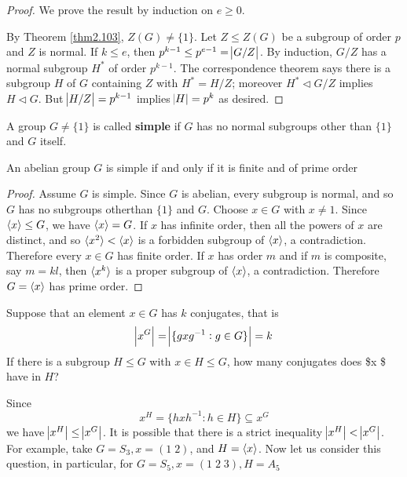 \documentclass[11pt]{article}
\begin{document}
\begin{proof}
We prove the result by induction on \(e\ge 0\).

By Theorem \ref{thm2.103}, \(Z(G)\neq\{1\}\). Let \(Z\le Z(G)\) be a subgroup of order
\(p\) and \(Z\) is normal. If \(k\le e\), then \(p^{k-1}\le p^{e-1}=\abs{G/Z}\). By
induction, \(G/Z\) has a normal subgroup \(H^*\) of order \(p^{k-1}\). The
correspondence theorem says there is a subgroup \(H\) of \(G\) containing \(Z\) with
\(H^*=H/Z\); moreover \(H^*\triangleleft G/Z\)  implies \(H\triangleleft G\). But
\(\abs{H/Z}=p^{k-1}\) implies \(\abs{H}=p^k\) as desired.
\end{proof}

\begin{definition}[]
A group \(G\neq\{1\}\) is called \textbf{simple} if \(G\) has no normal subgroups other than
\(\{1\}\) and  \(G\) itself.
\end{definition}

\begin{proposition}[]
An abelian group \(G\) is simple if and only if it is finite and of prime order
\end{proposition}
\begin{proof}
Assume \(G\) is simple. Since \(G\) is abelian, every subgroup is normal, and so \(G\)
has no subgroups otherthan \(\{1\}\) and \(G\). Choose \(x\in G\) with \(x\neq 1\).
Since \(\langle x\rangle\le G\), we have \(\langle x\rangle =G\). If \(x\) has infinite order, then
all the powers of \(x\) are distinct, and so \(\langle x^2\rangle<\langle x\rangle\) is a forbidden
subgroup of \(\langle x\rangle\), a contradiction. Therefore every \(x\in G\) has finite
order. If \(x\) has order \(m\) and if \(m\) is composite, say \(m=kl\), then 
\(\langle x^k\rangle\) is a proper subgroup of \(\langle x\rangle\), a contradiction. Therefore
\(G=\langle x\rangle\) has prime order.
\end{proof}

Suppose that an element \(x\in G\) has \(k\) conjugates, that is 
\begin{equation*}
\abs{x^G}=\abs{\{gxg^{-1}:g\in G\}}=k
\end{equation*}
If there is a subgroup \(H\le G\) with \(x\in H\le G\), how many conjugates does \$x
\$ have in \(H\)?

Since
\begin{equation*}
x^H=\{hxh^{-1}:h\in H\}\subseteq x^G
\end{equation*}
we have \(\abs{x^H}\le\abs{x^G}\). It is possible that there is a strict
inequality \(\abs{x^H}<\abs{x^G}\). For example, take \(G=S_3,x=(1\; 2)\), and
\(H=\langle x\rangle\). Now let us consider this question, in particular, for
\(G=S_5,x=(1\;2\;3), H=A_5\)
\end{document}
